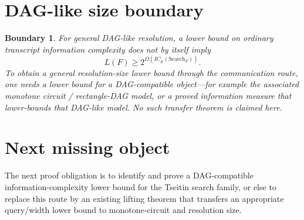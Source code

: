 \documentclass[11pt]{article}
\newtheorem{boundary}{Boundary}
\begin{document}
\section*{DAG-like size boundary}

\begin{boundary}
For general DAG-like resolution, a lower bound on ordinary transcript
information complexity does not by itself imply
\[
L(F)\ge 2^{\Omega(IC_\mu(\mathrm{Search}_F))}.
\]
To obtain a general resolution-size lower bound through the communication
route, one needs a lower bound for a DAG-compatible object---for example the
associated monotone circuit / rectangle-DAG model, or a proved information
measure that lower-bounds that DAG-like model.  No such transfer theorem is
claimed here.
\end{boundary}

\section*{Next missing object}

The next proof obligation is to identify and prove a DAG-compatible
information-complexity lower bound for the Tseitin search family, or else to
replace this route by an existing lifting theorem that transfers an
appropriate query/width lower bound to monotone-circuit and resolution size.
\end{document}
